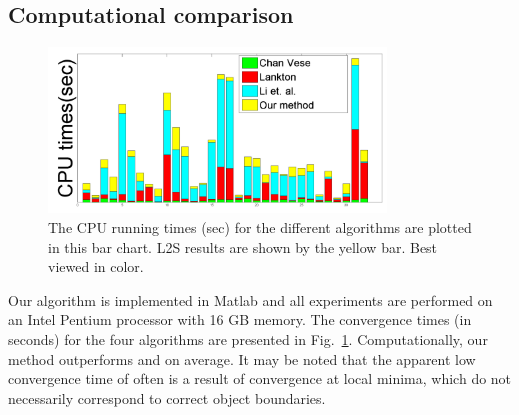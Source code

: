 \subsection{Computational comparison}
\begin{figure}[b]
\centering
\includegraphics[width=0.8\textwidth]{images/L2S_time}
\caption[Computational comparison for L2S]{The CPU running times (sec) for the different algorithms are plotted in this bar chart. L2S results are shown by the yellow bar. Best viewed in color.}	
\label{fig:L2S_comput}
\end{figure}
Our algorithm is implemented in Matlab and all experiments are performed on an Intel Pentium processor with 16 GB memory. The convergence times (in seconds) for the four algorithms are presented in Fig.~\ref{fig:L2S_comput}. Computationally, our method outperforms  \cite{lankton_localCV} and \cite{li_region_scalable} on average. It may be noted that the apparent low convergence time of \cite{chan_vese} often is a result of  convergence at local minima, which do not necessarily correspond to correct object boundaries.

